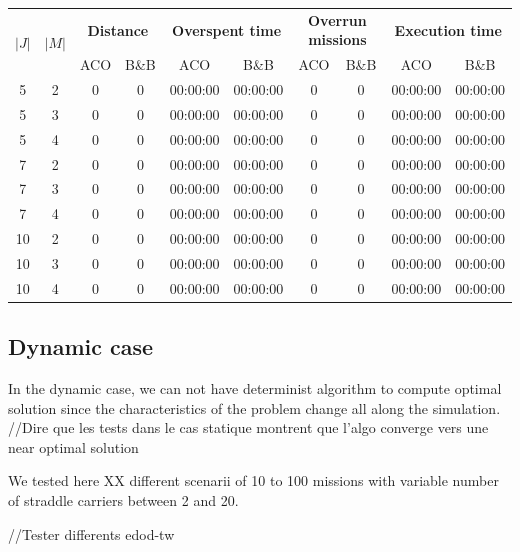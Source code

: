 \documentclass[a4paper,10pt]{article}
\begin{document}
\begin{center}
  \begin{tabular}{|c|c|c|c|c|c|c|c|c|c|} 
\hline
\multirow{2}{*}{\bf $|J|$} & \multirow{2}{*}{\bf $|M|$} & \multicolumn{2}{|c|}{\bf Distance} & \multicolumn{2}{|c|}{\bf Overspent time} & \multicolumn{2}{|c|}{\bf Overrun missions} &  \multicolumn{2}{|c|}{\bf Execution time} \\\cline{3-10}
& & ACO & B\&B & ACO & B\&B & ACO & B\&B & ACO & B\&B\\ \hline
5	 & 2 	& 0	& 0	& 00:00:00	& 00:00:00 	& 0	& 0	& 00:00:00	& 00:00:00\\
5	 & 3 	& 0	& 0	& 00:00:00	& 00:00:00	& 0	& 0	& 00:00:00	& 00:00:00\\
5	 & 4 	& 0	& 0	& 00:00:00	& 00:00:00	& 0	& 0	& 00:00:00	& 00:00:00\\
7	 & 2	& 0	& 0	& 00:00:00	& 00:00:00	& 0	& 0	& 00:00:00	& 00:00:00\\
7	 & 3	& 0	& 0	& 00:00:00	& 00:00:00	& 0	& 0	& 00:00:00	& 00:00:00\\
7	 & 4	& 0	& 0	& 00:00:00	& 00:00:00	& 0	& 0	& 00:00:00	& 00:00:00\\
10	 & 2	& 0	& 0	& 00:00:00	& 00:00:00	& 0	& 0	& 00:00:00	& 00:00:00\\
10	 & 3	& 0	& 0	& 00:00:00	& 00:00:00	& 0	& 0	& 00:00:00	& 00:00:00\\
10	 & 4	& 0	& 0	& 00:00:00	& 00:00:00	& 0	& 0	& 00:00:00	& 00:00:00\\
\hline
\end{tabular}
\end{center}

	\subsection{Dynamic case}
In the dynamic case, we can not have determinist algorithm to compute optimal solution since the characteristics of the problem change all along the simulation. //Dire que les tests dans le cas statique montrent que l'algo converge vers une near optimal solution

 We tested here XX different scenarii of 10 to 100 missions with variable number of straddle carriers between 2 and 20.

//Tester differents edod-tw
\end{document}
